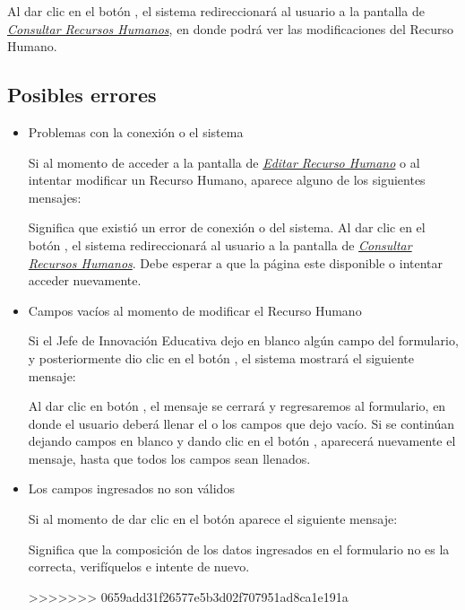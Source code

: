         Al dar clic en el botón , el sistema redireccionará al usuario a la pantalla de \hyperlink{consultarrh}{\textit{Consultar Recursos Humanos}}, en donde podrá ver las modificaciones del Recurso Humano.\\
        
        \subsection{Posibles errores}
    
            \begin{itemize}
            	\item Problemas con la conexión o el sistema
            
                	Si al momento de acceder a la pantalla de \hyperlink{editarrh}{\textit{Editar Recurso Humano}} o al intentar modificar un Recurso Humano, aparece alguno de los siguientes mensajes:
            	    
            
                	Significa que existió un error de conexión o del sistema. Al dar clic en el botón , el sistema redireccionará al usuario a la pantalla de \hyperlink{consultarrh}{\textit{Consultar Recursos Humanos}}. Debe esperar a que la página este disponible o intentar acceder nuevamente.
            
            	\item Campos vacíos al momento de modificar el Recurso Humano
            
                	Si el Jefe de Innovación Educativa dejo en blanco algún campo del formulario, y posteriormente dio clic en el botón , el sistema mostrará el siguiente mensaje:
            	    
            
            	    Al dar clic en botón , el mensaje se cerrará y regresaremos al formulario, en donde el usuario deberá llenar el o los campos que dejo vacío. Si se continúan dejando campos en blanco y dando clic en el botón , aparecerá nuevamente el mensaje, hasta que todos los campos sean llenados.
            
            	\item Los campos ingresados no son válidos
            
                	Si al momento de dar clic en el botón  aparece el siguiente mensaje:
            
                	Significa que la composición de los datos ingresados en el formulario no es la correcta, verifíquelos e intente de nuevo.
            
>>>>>>> 0659add31f26577e5b3d02f707951ad8ca1e191a
            \end{itemize}
